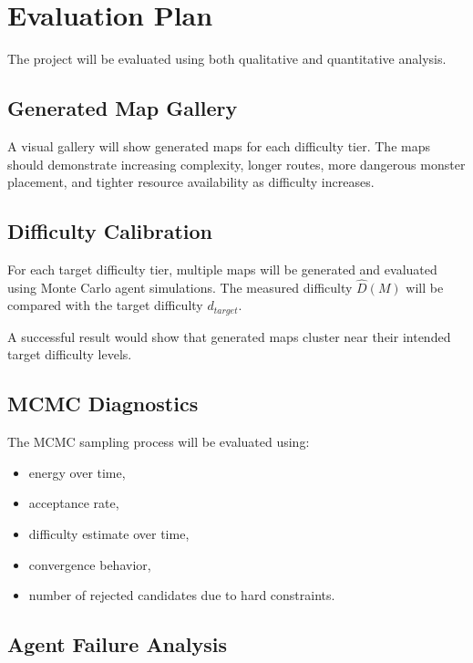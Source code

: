 \documentclass[11pt]{article}
\begin{document}
\section{Evaluation Plan}

The project will be evaluated using both qualitative and quantitative analysis.

\subsection{Generated Map Gallery}

A visual gallery will show generated maps for each difficulty tier. The maps should demonstrate increasing complexity, longer routes, more dangerous monster placement, and tighter resource availability as difficulty increases.

\subsection{Difficulty Calibration}

For each target difficulty tier, multiple maps will be generated and evaluated using Monte Carlo agent simulations. The measured difficulty $\hat{D}(M)$ will be compared with the target difficulty $d_{target}$.

A successful result would show that generated maps cluster near their intended target difficulty levels.

\subsection{MCMC Diagnostics}

The MCMC sampling process will be evaluated using:

\begin{itemize}[noitemsep]
    \item energy over time,
    \item acceptance rate,
    \item difficulty estimate over time,
    \item convergence behavior,
    \item number of rejected candidates due to hard constraints.
\end{itemize}

\subsection{Agent Failure Analysis}
\end{document}
